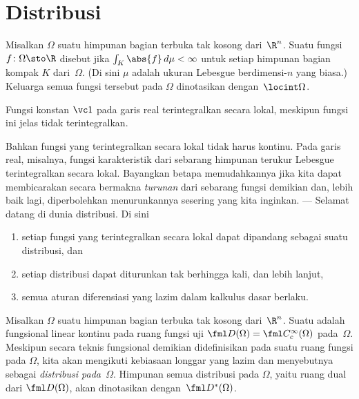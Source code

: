 \section{Distribusi}
\begin{defn} Misalkan $\Omega$ suatu himpunan bagian terbuka tak kosong dari~$\R^n$. Suatu fungsi $f\colon \Omega \sto \R$ disebut
 jika $\int_K \abs{f}\,d\mu < \infty$ untuk setiap himpunan bagian kompak $K$ dari~$\Omega$. (Di sini $\mu$ adalah ukuran Lebesgue
berdimensi-$n$ yang biasa.) Keluarga semua fungsi tersebut pada $\Omega$ dinotasikan
dengan~$\locint\Omega$.
\end{defn}

\begin{exam} Fungsi konstan $\vc 1$ pada garis real terintegralkan secara lokal, meskipun fungsi ini jelas tidak terintegralkan.
\end{exam}

Bahkan fungsi yang terintegralkan secara lokal tidak harus kontinu. Pada garis real, misalnya, fungsi karakteristik dari sebarang himpunan terukur Lebesgue
terintegralkan secara lokal. Bayangkan betapa memudahkannya jika kita dapat membicarakan secara bermakna \emph{turunan} dari sebarang fungsi demikian dan,
lebih baik lagi, diperbolehkan menurunkannya sesering yang kita inginkan. --- Selamat datang di dunia distribusi. Di sini
   \begin{enumerate}
       \item setiap fungsi yang terintegralkan secara lokal dapat dipandang sebagai suatu distribusi, dan
       \item setiap distribusi dapat diturunkan tak berhingga kali, dan lebih lanjut,
       \item semua aturan diferensiasi yang lazim dalam kalkulus dasar berlaku.
   \end{enumerate}

\begin{defn} Misalkan $\Omega$ suatu himpunan bagian terbuka tak kosong dari~$\R^n$. Suatu
 adalah fungsional linear kontinu pada ruang fungsi uji $\fml D(\Omega) = \fml C^\infty_c(\Omega)$ pada~$\Omega$.
Meskipun secara teknis fungsional demikian didefinisikan pada suatu ruang fungsi pada $\Omega$, kita akan mengikuti kebiasaan longgar yang lazim
dan menyebutnya sebagai \emph{distribusi pada~$\Omega$}. Himpunan semua distribusi pada $\Omega$, yaitu ruang dual dari $\fml D(\Omega)$,
akan dinotasikan dengan~$\fml D^*(\Omega)$.
\end{defn}

